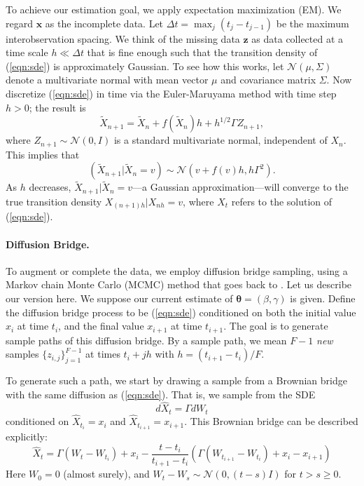\documentclass{article}
\newcommand{\btheta}{\ensuremath{\bm{\theta}}}
\newcommand{\bx}{\ensuremath{\mathbf{x}}}
\newcommand{\bz}{\ensuremath{\mathbf{z}}}
\begin{document}
To achieve our estimation goal, we apply expectation maximization (EM).  We regard $\bx$ as the incomplete data.  Let $\Delta t = \max_{j} (t_j - t_{j-1})$ be the maximum interobservation spacing.  We think of the missing data $\bz$ as data collected at a time scale $h \ll \Delta t$ that is fine enough such that the transition density of (\ref{eqn:sde}) is approximately Gaussian.  To see how this works, let $\mathcal{N}(\mu, \Sigma)$ denote a multivariate normal with mean vector $\mu$ and covariance matrix $\Sigma$.  Now discretize (\ref{eqn:sde}) in time via the Euler-Maruyama method with time step $h > 0$; the result is
\begin{equation} \label{eqn:euler}
\widetilde{X}_{n+1} = \widetilde{X}_n + f(\widetilde{X}_n) h + h^{1/2} \Gamma Z_{n+1},
\end{equation}
where $Z_{n+1} \sim \mathcal{N}(0, I)$ is a standard multivariate normal, independent of $X_n$.  This implies that
\begin{equation}
\label{eqn:condden}
(\widetilde{X}_{n+1} | \widetilde{X}_n = v) \sim \mathcal{N}(v + f(v) h, h \Gamma^2).
\end{equation}
As $h$ decreases, $\widetilde{X}_{n+1} | \widetilde{X}_n = v$---a Gaussian approximation---will converge to the true transition density $X_{(n+1)h} | X_{nh} = v$, where $X_t$ refers to the solution of (\ref{eqn:sde}).

\paragraph{Diffusion Bridge.} To augment or complete the data, we employ diffusion bridge sampling, using a Markov chain Monte Carlo (MCMC) method that goes back to \cite{roberts_inference_2001, papaspiliopoulos_data_2013}.  Let us describe our version here.  We suppose our current estimate of $\btheta = (\beta, \gamma)$ is given.  Define the diffusion bridge process to be (\ref{eqn:sde}) conditioned on both the initial value $x_i$ at time $t_i$, and the final value $x_{i+1}$ at time $t_{i+1}$.  The goal is to generate sample paths of this diffusion bridge.  By a sample path, we mean $F-1$ \emph{new} samples $\{z_{i,j}\}_{j=1}^{F-1}$ at times $t_i + j h$ with $h = (t_{i+1} - t_i)/F$.

To generate such a path, we start by drawing a sample from a Brownian bridge with the same diffusion as (\ref{eqn:sde}).  That is, we sample from the SDE
\begin{equation}
\label{eqn:bbridgesde}
d\widehat{X}_t = \Gamma dW_t
\end{equation}
conditioned on $\widehat{X}_{t_i} = x_i$ and $\widehat{X}_{t_{i+1}} = x_{i+1}$.  This Brownian bridge can be described explicitly:
\begin{equation}
\label{eqn:bbridge}
\widehat{X}_t = \Gamma (W_{t} - W_{t_i}) + x_i - \frac{t - t_i}{t_{i+1} - t_i} (\Gamma (W_{t_{i+1}} - W_{t_i}) + x_{i} - x_{i+1} )
\end{equation}
Here $W_0 = 0$ (almost surely), and $W_t - W_s \sim \mathcal{N}(0, (t-s)I)$ for $t > s \geq 0$. 
\end{document}
